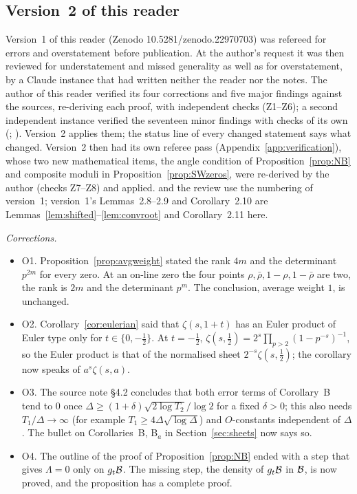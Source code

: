 \subsection{Version~2 of this reader}

Version~1 of this reader (Zenodo 10.5281/zenodo.22970703) was refereed for errors and overstatement before publication. At the author's request it was then reviewed for understatement and missed generality as well as for overstatement, by a Claude instance that had written neither the reader nor the notes. The author of this reader verified its four corrections and five major findings against the sources, re-deriving each proof, with independent checks (Z1--Z6); a second independent instance verified the seventeen minor findings with checks of its own (; ). Version~2 applies them; the status line of every changed statement says what changed. Version~2 then had its own referee pass (Appendix~\ref{app:verification}), whose two new mathematical items, the angle condition of Proposition~\ref{prop:NB} and composite moduli in Proposition~\ref{prop:SWzeros}, were re-derived by the author (checks Z7--Z8) and applied.  and the review use the numbering of version~1; version~1's Lemmas~2.8--2.9 and Corollary~2.10 are Lemmas~\ref{lem:shifted}--\ref{lem:convroot} and Corollary~2.11 here.

\emph{Corrections.}
\begin{itemize}
\item O1. Proposition~\ref{prop:avgweight} stated the rank $4m$ and the determinant $p^{2m}$ for every zero. At an on-line zero the four points $\rho,\bar\rho,1-\rho,1-\bar\rho$ are two, the rank is $2m$ and the determinant $p^m$. The conclusion, average weight $1$, is unchanged.
\item O2. Corollary~\ref{cor:eulerian} said that $\zeta(s,1+t)$ has an Euler product of Euler type only for $t\in\{0,-\tfrac12\}$. At $t=-\tfrac12$, $\zeta(s,\tfrac12)=2^s\prod_{p>2}(1-p^{-s})^{-1}$, so the Euler product is that of the normalised sheet $2^{-s}\zeta(s,\tfrac12)$; the corollary now speaks of $a^s\zeta(s,a)$.
\item O3. The source note  §4.2 concludes that both error terms of Corollary~B tend to $0$ once $\Delta\ge(1+\delta)\sqrt{2\log T_2}/\log2$ for a fixed $\delta>0$; this also needs $T_1/\Delta\to\infty$ (for example $T_1\ge4\Delta\sqrt{\log\Delta}$) and $O$-constants independent of $\Delta$. The bullet on Corollaries~B, B$_a$ in Section~\ref{sec:sheets} now says so.
\item O4. The outline of the proof of Proposition~\ref{prop:NB} ended with a step that gives $\Lambda=0$ only on $g_t\mathcal{B}$. The missing step, the density of $g_t\mathcal{B}$ in $\mathcal{B}$, is now proved, and the proposition has a complete proof.
\end{itemize}

